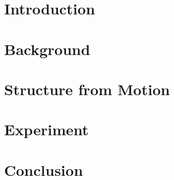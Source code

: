 \documentclass[11pt]{report}
\begin{document}
    
    \newpage

    

    \newpage
    \tableofcontents

    \newpage
    \chapter{Introduction}
    

    \newpage
    \chapter{Background}
    \label{chap:background}
    

    \newpage
    \chapter{Structure from Motion}
    \label{chap:sfm}
    

    \newpage
    \chapter{Experiment}
    \label{chap:experiment}
    

    \newpage
    \chapter{Conclusion}
    \label{chap:conclusion}
    

    
    
    
\end{document}
